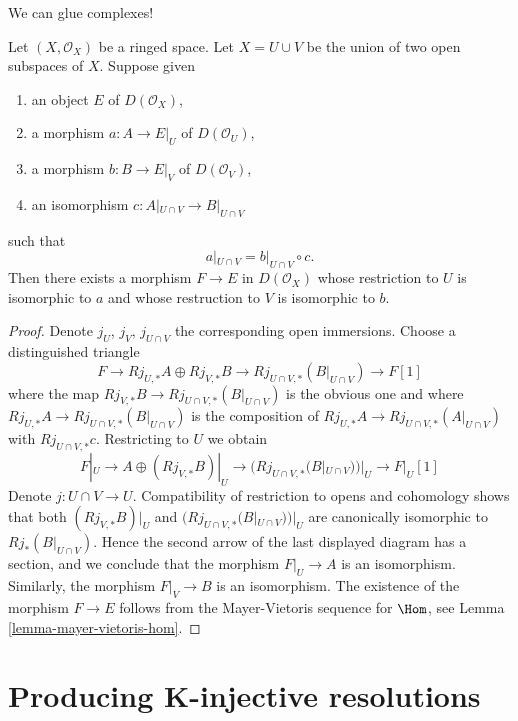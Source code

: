 \noindent
We can glue complexes!

\begin{lemma}
\label{lemma-glue}
Let $(X, \mathcal{O}_X)$ be a ringed space. Let $X = U \cup V$ be
the union of two open subspaces of $X$. Suppose given
\begin{enumerate}
\item an object $E$ of $D(\mathcal{O}_X)$,
\item a morphism $a : A \to E|_U$ of $D(\mathcal{O}_U)$,
\item a morphism $b : B \to E|_V$ of $D(\mathcal{O}_V)$,
\item an isomorphism $c : A|_{U \cap V} \to B|_{U \cap V}$
\end{enumerate}
such that
$$
a|_{U \cap V}  = b|_{U \cap V} \circ c.
$$
Then there exists a morphism $F \to E$ in $D(\mathcal{O}_X)$
whose restriction to $U$ is isomorphic to $a$
and whose restruction to $V$ is isomorphic to $b$.
\end{lemma}

\begin{proof}
Denote $j_U$, $j_V$, $j_{U \cap V}$ the corresponding open immersions.
Choose a distinguished triangle
$$
F \to Rj_{U, *}A \oplus Rj_{V, *}B \to Rj_{U \cap V, *}(B|_{U \cap V})
\to F[1]
$$
where the map $Rj_{V, *}B \to Rj_{U \cap V, *}(B|_{U \cap V})$ is the
obvious one and where
$Rj_{U, *}A \to Rj_{U \cap V, *}(B|_{U \cap V})$
is the composition of
$Rj_{U, *}A \to Rj_{U \cap V, *}(A|_{U \cap V})$
with $Rj_{U \cap V, *}c$. Restricting to $U$ we obtain
$$
F|_U \to A \oplus (Rj_{V, *}B)|_U \to (Rj_{U \cap V, *}(B|_{U \cap V}))|_U
\to F|_U[1]
$$
Denote $j : U \cap V \to U$. Compatibility of restriction to opens and
cohomology shows that both
$(Rj_{V, *}B)|_U$ and $(Rj_{U \cap V, *}(B|_{U \cap V}))|_U$
are canonically isomorphic to $Rj_*(B|_{U \cap V})$.
Hence the second arrow of the last displayed diagram has
a section, and we conclude that the morphism $F|_U \to A$ is
an isomorphism. Similarly, the morphism $F|_V \to B$ is an
isomorphism. The existence of the morphism $F \to E$ follows
from the Mayer-Vietoris sequence for $\Hom$, see
Lemma \ref{lemma-mayer-vietoris-hom}.
\end{proof}








\section{Producing K-injective resolutions}
\label{section-K-injective}


